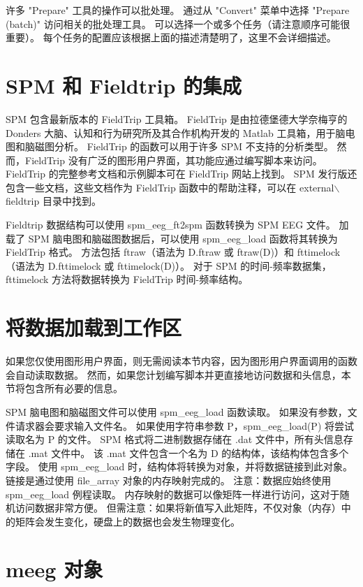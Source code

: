 许多 "Prepare" 工具的操作可以批处理。
通过从 "Convert" 菜单中选择 "Prepare (batch)" 访问相关的批处理工具。
可以选择一个或多个任务（请注意顺序可能很重要）。
每个任务的配置应该根据上面的描述清楚明了，这里不会详细描述。


\section{SPM 和 Fieldtrip 的集成}


SPM 包含最新版本的 FieldTrip 工具箱。
FieldTrip 是由拉德堡德大学奈梅亨的 Donders 大脑、认知和行为研究所及其合作机构开发的 Matlab 工具箱，用于脑电图和脑磁图分析。
FieldTrip 的函数可以用于许多 SPM 不支持的分析类型。
然而，FieldTrip 没有广泛的图形用户界面，其功能应通过编写脚本来访问。
FieldTrip 的完整参考文档和示例脚本可在 FieldTrip 网站上找到。
SPM 发行版还包含一些文档，这些文档作为 FieldTrip 函数中的帮助注释，可以在 external$\backslash$fieldtrip 目录中找到。


Fieldtrip 数据结构可以使用 spm\_eeg\_ft2spm 函数转换为 SPM EEG 文件。
加载了 SPM 脑电图和脑磁图数据后，可以使用 spm\_eeg\_load 函数将其转换为 FieldTrip 格式。
方法包括 ftraw（语法为 D.ftraw 或 ftraw(D)）和 fttimelock（语法为 D.fttimelock 或 fttimelock(D)）。
对于 SPM 的时间-频率数据集，fttimelock 方法将数据转换为 FieldTrip 时间-频率结构。


\section{将数据加载到工作区}

如果您仅使用图形用户界面，则无需阅读本节内容，因为图形用户界面调用的函数会自动读取数据。
然而，如果您计划编写脚本并更直接地访问数据和头信息，本节将包含所有必要的信息。


SPM 脑电图和脑磁图文件可以使用 spm\_eeg\_load 函数读取。
如果没有参数，文件请求器会要求输入文件名。
如果使用字符串参数 P，spm\_eeg\_load(P) 将尝试读取名为 P 的文件。
SPM 格式将二进制数据存储在 .dat 文件中，所有头信息存储在 .mat 文件中。
该 .mat 文件包含一个名为 D 的结构体，该结构体包含多个字段。
使用 spm\_eeg\_load 时，结构体将转换为对象，并将数据链接到此对象。
链接是通过使用 file\_array 对象的内存映射完成的。
注意：数据应始终使用 spm\_eeg\_load 例程读取。
内存映射的数据可以像矩阵一样进行访问，这对于随机访问数据非常方便。
但需注意：如果将新值写入此矩阵，不仅对象（内存）中的矩阵会发生变化，硬盘上的数据也会发生物理变化。


\section{meeg 对象}

